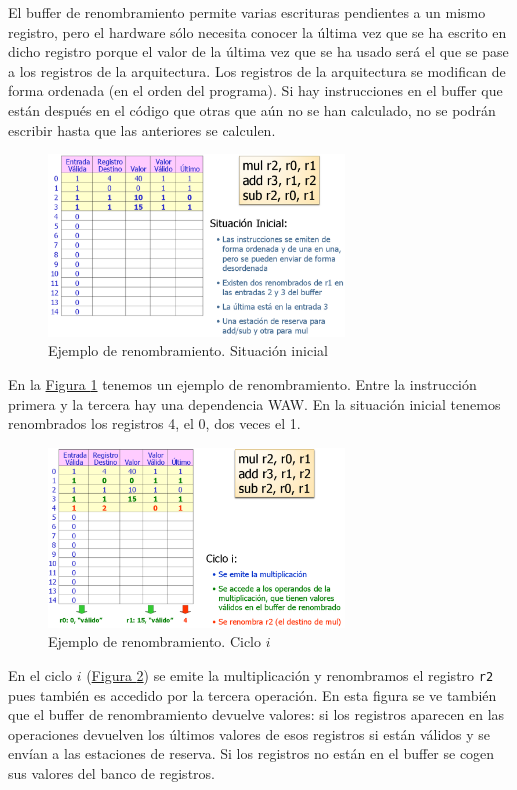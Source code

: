 \documentclass[10pt,a4paper,spanish]{report}
\begin{document}
El buffer de renombramiento permite varias escrituras pendientes a un mismo registro, pero el hardware sólo necesita conocer la última vez que se ha escrito en dicho registro porque el valor de la última vez que se ha usado será el que se pase a los registros de la arquitectura. Los registros de la arquitectura se modifican de forma ordenada (en el orden del programa). Si hay instrucciones en el buffer que están después en el código que otras que aún no se han calculado, no se podrán escribir hasta que las anteriores se calculen.

\begin{figure}[!h]
\centering
\includegraphics[width=0.7\textwidth]{98}
\caption{Ejemplo de renombramiento. Situación inicial}
\label{ejemplo_renom1}
\end{figure}

En la \hyperref[ejemplo_renom1]{Figura \ref*{ejemplo_renom1}} tenemos un ejemplo de renombramiento. Entre la instrucción primera y la tercera hay una dependencia WAW. En la situación inicial tenemos renombrados los registros 4, el 0, dos veces el 1.

\begin{figure}[!h]
\centering
\includegraphics[width=0.7\textwidth]{97}
\caption{Ejemplo de renombramiento. Ciclo $i$}
\label{ejemplo_renom2}
\end{figure}

En el ciclo $i$ (\hyperref[ejemplo_renom2]{Figura \ref*{ejemplo_renom2}}) se emite la multiplicación y renombramos el registro \verb*|r2| pues también es accedido por la tercera operación. En esta figura se ve también que el buffer de renombramiento devuelve valores: si los registros aparecen en las operaciones devuelven los últimos valores de esos registros si están válidos y se envían a las estaciones de reserva. Si los registros no están en el buffer se cogen sus valores del banco de registros.
\end{document}
